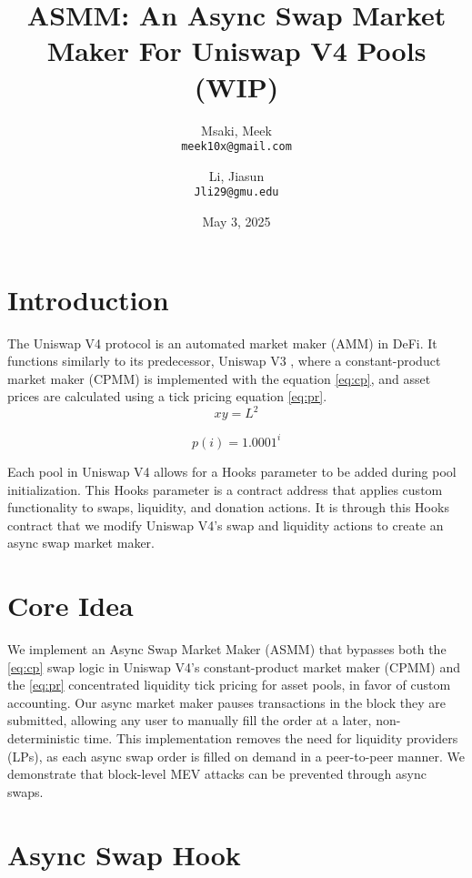 \documentclass[bibliography=numbered]{article}
\title{ASMM: An Async Swap Market Maker For Uniswap V4 Pools (WIP)}
\author{
  Msaki, Meek\\
  \texttt{meek10x@gmail.com}
  \and
  Li, Jiasun\\
  \texttt{Jli29@gmu.edu}
}
\date{May 3, 2025}
\begin{document}
\maketitle
\section{Introduction}

The Uniswap V4 \cite{UniswapV4} protocol is an automated market maker (AMM) in DeFi. It functions similarly to its predecessor, Uniswap V3 \cite{UniswapV3}, where a constant-product market maker (CPMM) is implemented with the equation \eqref{eq:cp}, and asset prices are calculated using a tick pricing equation \eqref{eq:pr}.  
\begin{equation}
\label{eq:cp}
    xy 
    =
    L^2
\end{equation}

\begin{equation}
\label{eq:pr}
    p(i) 
    =
    1.0001^{i}
\end{equation}

Each pool in Uniswap V4 allows for a Hooks parameter to be added during pool initialization. This Hooks parameter is a contract address that applies custom functionality to swaps, liquidity, and donation actions. It is through this Hooks contract that we modify Uniswap V4's swap and liquidity actions to create an async swap market maker.

\section{Core Idea}

We implement an Async Swap Market Maker (ASMM) that bypasses both the \eqref{eq:cp} swap logic in Uniswap V4’s constant-product market maker (CPMM) and the \eqref{eq:pr} concentrated liquidity tick pricing for asset pools, in favor of custom accounting. Our async market maker pauses transactions in the block they are submitted, allowing any user to manually fill the order at a later, non-deterministic time. This implementation removes the need for liquidity providers (LPs), as each async swap order is filled on demand in a peer-to-peer manner. We demonstrate that block-level MEV attacks can be prevented through async swaps. 

\section{Async Swap Hook}
\end{document}
